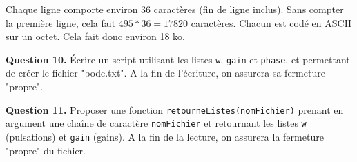 \documentclass[11pt,fleqn]{book} %
\begin{document}
Chaque ligne comporte environ 36 caractères (fin de ligne inclus).
Sans compter la première ligne, cela fait $495*36=17820$ caractères.
Chacun est codé en ASCII sur un octet.
Cela fait donc environ 18 ko.


\begin{tBox}
\textbf{Question 10.} Écrire un script utilisant les listes \texttt{w}, \texttt{gain} et \texttt{phase}, et permettant de créer le fichier "bode.txt". A la fin de l'écriture, on assurera sa fermeture "propre".
\end{tBox}



\begin{tBox}
\textbf{Question 11.} Proposer une fonction \texttt{retourneListes(nomFichier)} prenant en argument une chaîne de caractère \texttt{nomFichier} et retournant les listes \texttt{w} (pulsations) et \texttt{gain} (gains). A la fin de la lecture, on assurera la fermeture "propre" du fichier.
\end{tBox}



\vfill
\end{document}
